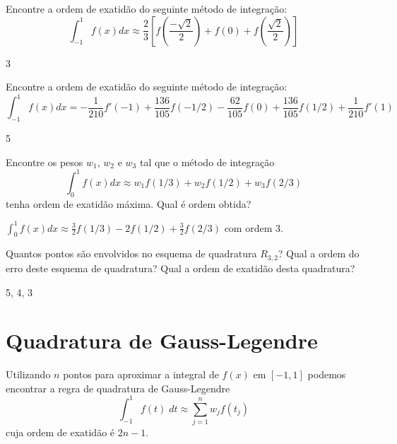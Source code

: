 \begin{exer}
Encontre a ordem de exatidão do seguinte método de integração:
$$\int_{-1}^1f(x)dx\approx \frac{2}{3}\left[f\left(\frac{-\sqrt{2}}{2}\right)+f(0)+f\left(\frac{\sqrt{2}}{2}\right)\right]$$
\end{exer}
\begin{resp}
  
3    
  
\end{resp}


\begin{exer}
Encontre a ordem de exatidão do seguinte método de integração:
$$\int_{-1}^1f(x)dx=-\frac{1}{210}f'(-1)+\frac{136}{105} f(-1/2) - \frac{62}{105} f(0) + \frac{136}{105}f(1/2) +\frac{1}{210}f'(1)$$
\end{exer}
\begin{resp}
  
5    
  
\end{resp}

\begin{exer} Encontre os pesos $w_1$, $w_2$ e $w_3$ tal que o método de integração
$$\int_0^1 f(x)dx \approx w_1 f(1/3)  + w_2f(1/2) + w_3f(2/3)$$
tenha ordem de exatidão máxima. Qual é ordem obtida?
\end{exer}
\begin{resp}
  
$\int_0^1 f(x)dx \approx \frac{3}{2} f(1/3)  -2f(1/2) + \frac{3}{2}f(2/3)$ com ordem 3.    
  
\end{resp}

\begin{exer}
Quantos pontos são envolvidos no esquema de quadratura $R_{3,2}$? Qual a ordem do erro deste esquema de quadratura? Qual a ordem de exatidão desta quadratura?
\end{exer}
\begin{resp}
  
 5, 4, 3    
  
\end{resp}


\section{Quadratura de Gauss-Legendre}

Utilizando $n$ pontos para aproximar a integral de $f(x)$ em $[-1,1]$ podemos encontrar a regra de quadratura de Gauss-Legendre 
$$\int_{-1}^1 f(t)\;dt \approx \sum_{j=1}^n w_j f(t_j)$$
cuja ordem de exatidão é $2n-1$. 

